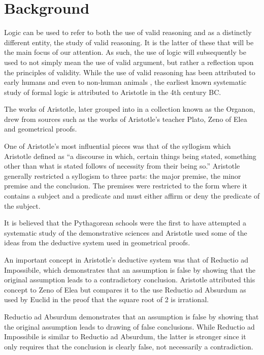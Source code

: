 \nocite{*}
\section{Background}

Logic can be used to refer to both the use of valid reasoning and as a distinctly different entity, the study of valid reasoning. It is the latter of these that will be the main focus of our attention. As such, the use of logic will subsequently be used to not simply mean the use of valid argument, but rather a reflection upon the principles of validity. While the use of valid reasoning has been attributed to early humans and even to non-human animals \cite{wolfgang1999mentality}, the earliest known systematic study of formal logic is attributed to Aristotle in the 4th century BC. \cite[p.~300]{salmon2007introduction}

The works of Aristotle, later grouped into in a collection known as the Organon, drew from sources such as the works of Aristotle’s teacher Plato, Zeno of Elea and geometrical proofs. \cite{KingShapiro95} 

One of Aristotle's most influential pieces was that of the syllogism which Aristotle defined as ``a discourse in which, certain things being stated, something other than what is stated follows of necessity from their being so.'' \cite[p.~4]{aristotle2004prior} Aristotle generally restricted a syllogism to three parts: the major premise, the minor premise and the conclusion. The premises were restricted to the form where it contains a subject and a predicate and must either affirm or deny the predicate of the subject. \cite{sep-aristotle-logic}


It is believed that the Pythagorean schools were the first to have attempted a systematic study of the demonstrative sciences and Aristotle used some of the ideas from the deductive system used in geometrical proofs. \cite[p.~3]{kneale1962developments}

 An important concept in Aristotle's deductive system was that of Reductio ad Impossibile, which demonstrates that an assumption is false by showing that the original assumption leads to a contradictory conclusion. Aristotle attributed this concept to Zeno of Elea but compares it to the use Reductio ad Absurdum as used by Euclid in the proof that the square root of 2 is irrational.\cite[p.~8]{kneale1962developments}

Reductio ad Absurdum demonstrates that an assumption is false by showing that the original assumption leads to drawing of false conclusions. While Reductio ad Impossibile is similar to Reductio ad Absurdum, the latter is stronger since it only requires that the conclusion is clearly false, not necessarily a contradiction. \cite[p.~9]{kneale1962developments}


